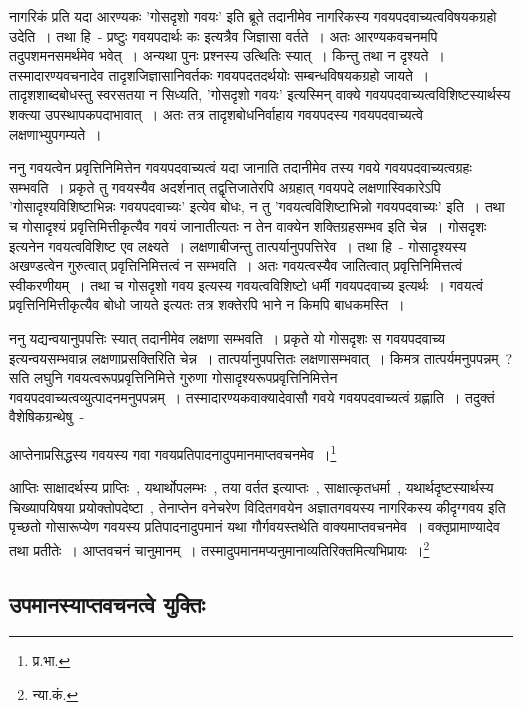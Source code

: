 		नागरिकं प्रति यदा आरण्यकः 'गोसदृशो गवयः' इति ब्रूते तदानीमेव नागरिकस्य गवयपदवाच्यत्वविषयकग्रहो उदेति~। तथा हि~- प्रष्टुः गवयपदार्थः कः इत्यत्रैव जिज्ञासा वर्तते~। अतः आरण्यकवचनमपि तदुपशमनसमर्थमेव भवेत्~। अन्यथा पुनः प्रश्नस्य उत्थितिः स्यात्~। किन्तु तथा न दृश्यते~। तस्मादारण्यवचनादेव तादृशजिज्ञासानिवर्तकः गवयपदतदर्थयोः सम्बन्धविषयकग्रहो जायते~। तादृशशाब्दबोधस्तु स्वरसतया न सिध्यति, 'गोसदृशो गवयः' इत्यस्मिन् वाक्ये गवयपदवाच्यत्वविशिष्टस्यार्थस्य शक्त्या उपस्थापकपदाभावात्~। अतः तत्र तादृशबोधनिर्वाहाय गवयपदस्य गवयपदवाच्यत्वे लक्षणाभ्युपगम्यते~। 

		ननु गवयत्वेन प्रवृत्तिनिमित्तेन गवयपदवाच्यत्वं यदा जानाति तदानीमेव तस्य गवये गवयपदवाच्यत्वग्रहः सम्भवति~। प्रकृते तु गवयस्यैव अदर्शनात् तद्वृत्तिजातेरपि अग्रहात् गवयपदे लक्षणास्विकारेऽपि 'गोसादृश्यविशिष्टाभिन्नः गवयपदवाच्यः' इत्येव बोधः, न तु 'गवयत्वविशिष्टाभिन्नो गवयपदवाच्यः' इति~। तथा च गोसादृश्यं प्रवृत्तिमित्तीकृत्यैव गवयं जानातीत्यतः न तेन वाक्येन शक्तिग्रहसम्भव इति चेन्न~।  गोसदृशः इत्यनेन गवयत्वविशिष्ट एव लक्ष्यते~। लक्षणाबीजन्तु तात्पर्यानुपपत्तिरेव~। तथा हि~- गोसादृश्यस्य अखण्डत्वेन गुरुत्वात् प्रवृत्तिनिमित्तत्वं न सम्भवति~। अतः गवयत्वस्यैव जातित्वात् प्रवृत्तिनिमित्तत्वं स्वीकरणीयम्~। तथा च गोसदृशो गवय इत्यस्य गवयत्वविशिष्टो धर्मी गवयपदवाच्य इत्यर्थः~। गवयत्वं प्रवृत्तिनिमित्तीकृत्यैव बोधो जायते इत्यतः तत्र शक्तेरपि भाने न किमपि बाधकमस्ति~। 

		ननु यद्यन्वयानुपपत्तिः स्यात् तदानीमेव लक्षणा सम्भवति~। प्रकृते यो गोसदृशः स गवयपदवाच्य इत्यन्वयसम्भवान्न लक्षणाप्रसक्तिरिति चेन्न~। तात्पर्यानुपपत्तितः लक्षणासम्भवात्~।  किमत्र तात्पर्यमनुपपन्नम्~? सति लघुनि गवयत्वरूपप्रवृत्तिनिमित्ते गुरुणा गोसादृश्यरूपप्रवृत्तिनिमित्तेन गवयपदवाच्यत्वव्युत्पादनमनुपपन्नम्~। तस्मादारण्यकवाक्यादेवासौ गवये गवयपदवाच्यत्वं ग्रह्णाति~। तदुक्तं वैशेषिकग्रन्थेषु~-

		{\fontsize{11.7}{0}\selectfont\s  आप्तेनाप्रसिद्धस्य गवयस्य गवा गवयप्रतिपादनादुपमानमाप्तवचनमेव~।\footnote{प्र.भा.}}

		{\fontsize{11.7}{0}\selectfont\s  आप्तिः साक्षादर्थस्य प्राप्तिः~, यथार्थोपलम्भः~, तया वर्तत इत्याप्तः~, साक्षात्कृतधर्मा~, यथार्थदृष्टस्यार्थस्य चिख्यापयिषया प्रयोक्तोपदेष्टा~, तेनाप्तेन वनेचरेण विदितगवयेन अज्ञातगवयस्य नागरिकस्य कीदृग्गवय इति पृच्छतो गोसारूप्येण गवयस्य प्रतिपादनादुपमानं यथा गौर्गवयस्तथेति वाक्यमाप्तवचनमेव~। वक्तृप्रामाण्यादेव तथा प्रतीतेः~। आप्तवचनं चानुमानम्~। तस्मादुपमानमप्यनुमानाव्यतिरिक्तमित्यभिप्रायः~।\footnote{न्या.कं.}}

		\subsection{उपमानस्याप्तवचनत्वे युक्तिः}

